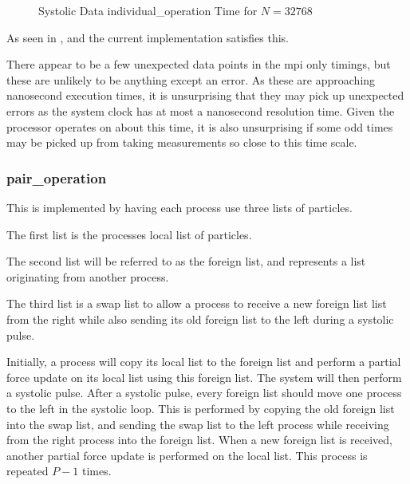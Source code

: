 \begin{figure}
    
    \caption{Systolic Data individual\_operation Time for $N = 32768$}
    \label{fig:v0_systolic_individual_operation_32768_logtime}
\end  {figure}

As seen in
,
 and
the current implementation satisfies this.

There appear to be a few unexpected data points in the mpi only timings,
but these are unlikely to be anything except an error.
%
As these are approaching nanosecond execution times, it is
unsurprising that they may pick up unexpected errors as the system clock
has at most a nanosecond resolution time.
%
Given the processor operates on about this time, it is also unsurprising
if some odd times may be picked up from taking measurements so
close to this time scale.


%
%

\subsubsection{pair\_operation}
This is implemented by having each process use three lists of particles.

The first list is the processes local list of particles.

The second list will be referred to as the foreign list, and
represents a list originating from another process.

The third list is a swap list to allow a process to receive a new
foreign list list from the right
while also sending its old foreign list to the left
during a systolic pulse.

Initially, a process will copy its local list to the foreign list
and perform a partial force update on its local list using this
foreign list.
%
The system will then perform a systolic pulse.
After a systolic pulse, every foreign list should move one process
to the left in the systolic loop.
%
This is performed by copying the old foreign list into the
swap list, and sending the swap list to the left process while
receiving from the right process into the foreign list.
%
When a new foreign list is received, another partial force update
is performed on the local list.
%
This process is repeated $P-1$ times.

